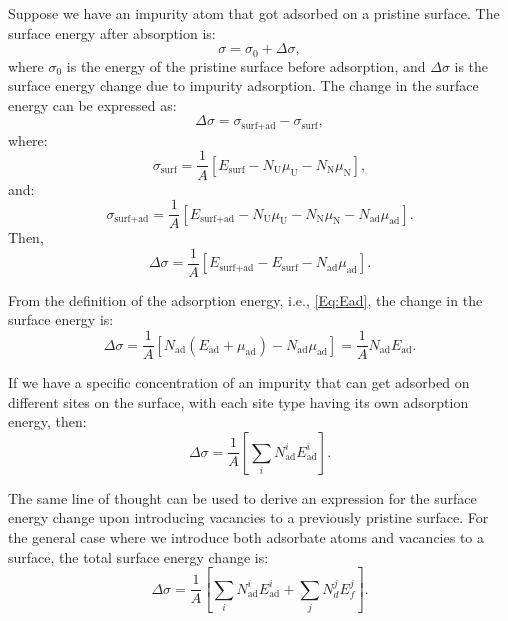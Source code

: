 \documentclass[preprint,12pt,sort&compress]{elsarticle}
\newcommand{\?}{\stackrel{?}{=}}
\begin{document}
Suppose we have an impurity atom that got adsorbed on a pristine surface. The surface energy after absorption is: 
\begin{equation}
\sigma = \sigma_0 + \Delta \sigma,
\end{equation}
where $\sigma_0$ is the energy of the pristine surface before adsorption, and $\Delta \sigma$ is the surface energy change due to impurity adsorption. The change in the surface energy can be expressed as:
\begin{equation}
\Delta \sigma = \sigma_\text{surf+ad} - \sigma_\text{surf},
\end{equation}
where:
\begin{equation}
\sigma_\text{surf} = \frac{1}{A} \left[ E_\text{surf} - N_\text{U} \mu_\text{U} - N_\text{N} \mu_\text{N} \right],
\end{equation}
and:
\begin{equation}
\sigma_\text{surf+ad} = \frac{1}{A} \left[ E_\text{surf+ad} - N_\text{U} \mu_\text{U} - N_\text{N} \mu_\text{N} - N_\text{ad} \mu_\text{ad} \right].
\end{equation}
Then,
\begin{equation}
\Delta \sigma = \frac{1}{A} \left[ E_\text{surf+ad} - E_\text{surf} - N_\text{ad} \mu_\text{ad} \right].
\end{equation}

From the definition of the adsorption energy, i.e., \cref{Eq:Ead}, the change in the surface energy is:
\begin{equation}
\Delta \sigma = \frac{1}{A} \left[ N_\text{ad} ( E_\text{ad} + \mu_\text{ad} ) - N_\text{ad} \mu_\text{ad} \right] = \frac{1}{A} N_\text{ad} E_\text{ad}. 
\end{equation}

If we have a specific concentration of an impurity that can get adsorbed on different sites on the surface, with each site type having its own adsorption energy, then:
\begin{equation}
\Delta \sigma = \frac{1}{A} \left[ \sum_i N_\text{ad}^i E_\text{ad}^i \right].
\end{equation}

The same line of thought can be used to derive an expression for the surface energy change upon introducing vacancies to a previously pristine surface. For the general case where we introduce both adsorbate atoms and vacancies to a surface, the total surface energy change is:
\begin{equation}
\Delta \sigma = \frac{1}{A} \left[ \sum_i N_\text{ad}^i E_\text{ad}^i + \sum_j N_d^j E_f^j \right].
\label{Eq:DeltaSigma}
\end{equation}
\end{document}

